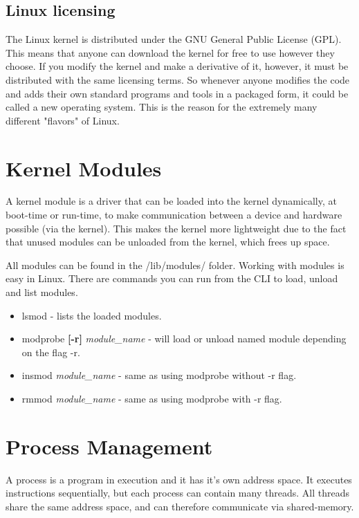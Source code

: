 \documentclass[12pt]{article}
\begin{document}
\subsection{Linux licensing}
The Linux kernel is distributed under the GNU General Public License (GPL). 
This means that anyone can download the kernel for free to use however they choose.
If you modify the kernel and make a derivative of it, however, it must be distributed with the same licensing terms.
So whenever anyone modifies the code and adds their own standard programs and tools in a packaged form, it could be called a new operating system.
This is the reason for the extremely many different "flavors" of Linux.

\section{Kernel Modules} %
A kernel module is a driver that can be loaded into the kernel dynamically, at boot-time or run-time,
to make communication between a device and hardware possible (via the kernel).
This makes the kernel more lightweight due to the fact that unused modules can be unloaded from the kernel, which frees up space.

All modules can be found in the /lib/modules/ folder.
Working with modules is easy in Linux. There are commands you can run from the CLI to load, unload and list modules.
\begin{itemize}
  \item lsmod - lists the loaded modules.
  \item modprobe \textbf{[-r]} \textit{module\_name} - will load or unload named module depending on the flag -r.
  \item insmod \textit{module\_name} - same as using modprobe without -r flag.
  \item rmmod \textit{module\_name} - same as using modprobe with -r flag.
\end{itemize}

\section{Process Management} %
A process is a program in execution and it has it's own address space.
It executes instructions sequentially, but each process can contain many threads. 
All threads share the same address space, and can therefore communicate via shared-memory.
\end{document}
